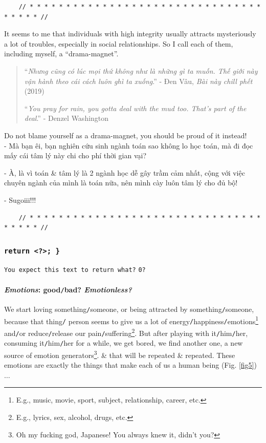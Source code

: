 \documentclass[12pt]{article}
\begin{document}
\begin{verbatim}
	// * * * * * * * * * * * * * * * * * * * * * * * * * * * * * * * * * * * * * //
\end{verbatim}

\noindent
{} It seems to me that individuals with high integrity usually attracts mysteriously a lot of troubles, especially in social relationships. So I call each of them, including myself, a ``drama-magnet''.

\begin{quotation}
	``{\it Nhưng cũng có lúc mọi thứ không như là những gì ta muốn. Thế giới này vận hành theo cái cách luôn ghì ta xuống}.'' - Đen Vâu, {\it Bài này chill phết} (2019)
	
	``{\it You pray for rain, you gotta deal with the mud too. That's part of the deal}.'' - Denzel Washington
\end{quotation}
Do not blame yourself as a drama-magnet, you should be proud of it instead!
\\

- Mà bạn êi, bạn nghiên cứu sinh ngành toán sao không lo học toán, mà đi đọc mấy cái tâm lý này chi cho phí thời gian vại?

- À, là vì toán \& tâm lý là 2 ngành học dễ gây trầm cảm nhất, cộng với việc chuyên ngành của mình là toán nữa, nên mình cày luôn tâm lý cho đủ bộ!

- Sugoiii!!!

\begin{verbatim}
	// * * * * * * * * * * * * * * * * * * * * * * * * * * * * * * * * * * * * * //
\end{verbatim}

\subsubsection{{\tt {\color{RubineRed}return} {\color{Purple}<?>}; \}}}
{\tt \small You expect this text to return what?} {\tt 0?}

\paragraph{{\it Emotions}: good{\tt/}bad? {\it Emotionless?}}
\noindent
{} We start loving something{\tt/}someone, or being attracted by something{\tt/}someone, because that thing{\tt/} person seems to give us a lot of energy{\tt/}happiness{\tt/}emotions\footnote{E.g., music, movie, sport, subject, relationship, career, etc.} and{\tt/}or reduce{\tt/}release our pain{\tt/}suffering\footnote{E.g., lyrics, sex, alcohol, drugs, etc.}. But after playing with it{\tt/}him{\tt/}her, consuming it{\tt/}him{\tt/}her for a while, we get bored, we find another one, a new source of emotion generators\footnote{Oh my fucking god, Japanese! You always knew it, didn't you?}. \& that will be repeated \& repeated. These emotions are exactly the things that make each of us a human being (Fig. \ref{fig5})$\ldots$
\end{document}
